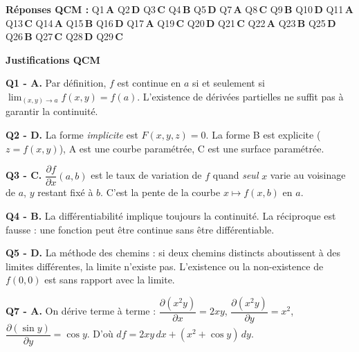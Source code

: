 \documentclass[11pt,a4paper]{article}
\begin{document}
\vspace{2pt}

\begin{notebox}
\textbf{Réponses QCM :}\quad
Q1\,\textbf{A} \quad Q2\,\textbf{D} \quad Q3\,\textbf{C} \quad Q4\,\textbf{B} \quad Q5\,\textbf{D} \quad
Q7\,\textbf{A} \quad Q8\,\textbf{C} \quad Q9\,\textbf{B} \quad Q10\,\textbf{D} \quad Q11\,\textbf{A} \quad
Q13\,\textbf{C} \quad Q14\,\textbf{A} \quad Q15\,\textbf{B} \quad Q16\,\textbf{D} \quad Q17\,\textbf{A} \quad
Q19\,\textbf{C} \quad Q20\,\textbf{D} \quad Q21\,\textbf{C} \quad Q22\,\textbf{A} \quad Q23\,\textbf{B} \quad
Q25\,\textbf{D} \quad Q26\,\textbf{B} \quad Q27\,\textbf{C} \quad Q28\,\textbf{D} \quad Q29\,\textbf{C}
\end{notebox}

\vspace{4pt}

\noindent\textbf{Justifications QCM}

\smallskip
\noindent\textbf{Q1 - A.} Par définition, $f$ est continue en $a$ si et seulement si $\lim_{(x,y)\to a}f(x,y) = f(a)$. L'existence de dérivées partielles ne suffit pas à garantir la continuité.

\smallskip
\noindent\textbf{Q2 - D.} La forme \emph{implicite} est $F(x,y,z)=0$. La forme B est explicite ($z=f(x,y)$), A est une courbe paramétrée, C est une surface paramétrée.

\smallskip
\noindent\textbf{Q3 - C.} $\dfrac{\partial f}{\partial x}(a,b)$ est le taux de variation de $f$ quand \emph{seul} $x$ varie au voisinage de $a$, $y$ restant fixé à $b$. C'est la pente de la courbe $x\mapsto f(x,b)$ en $a$.

\smallskip
\noindent\textbf{Q4 - B.} La différentiabilité implique toujours la continuité. La réciproque est fausse : une fonction peut être continue sans être différentiable.

\smallskip
\noindent\textbf{Q5 - D.} La méthode des chemins : si deux chemins distincts aboutissent à des limites différentes, la limite n'existe pas. L'existence ou la non-existence de $f(0,0)$ est sans rapport avec la limite.

\smallskip
\noindent\textbf{Q7 - A.} On dérive terme à terme : $\dfrac{\partial(x^2y)}{\partial x} = 2xy$, $\dfrac{\partial(x^2y)}{\partial y} = x^2$, $\dfrac{\partial(\sin y)}{\partial y} = \cos y$. D'où $df = 2xy\,dx + (x^2+\cos y)\,dy$.
\end{document}
